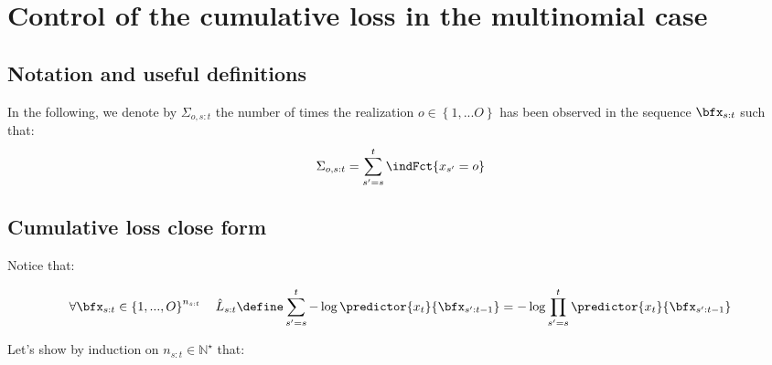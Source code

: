 \documentclass{article} %
\begin{document}
\section{Control of the cumulative loss in the multinomial case}

\subsection{Notation and useful definitions}

	In the following, we denote by $\Sigma_{o,s:t}$ the number of times the realization $o \in \left\lbrace 1,...O \right\rbrace$ has been observed in the sequence $\bfx_{s:t}$ such that:  
	\begin{align*}
	\Sigma_{o,s:t} = \sum_{s'=s}^t \indFct{x_{s'}= o} 
	\end{align*}

\subsection{Cumulative loss close form}

Notice that: 

\begin{align*}
\forall  \bfx_{s:t} \in \left\lbrace 1,..., O \right\rbrace^{n_{s:t}} \quad \hat{L}_{s:t} \define \sum_{s'=s}^t -\log \predictor{x_{t}}{\bfx_{s':t-1}} = -\log \prod_{s'=s}^t \predictor{x_{t}}{\bfx_{s':t-1}}    
\end{align*}

Let's show by induction on $n_{s:t} \in \mathbb{N}^\star$ that: 

\begin{comment}
\begin{align*}
\forall  \bfx_{s:t} \in \left\lbrace 1,..., O \right\rbrace^{n_{s:t}} \quad  \prod_{s'=s}^t  \predictor{x_{t}}{\bfx_{s':t-1}} &=  \frac{\prod\limits_{o=1}^{O}  \Sigma_{o,s:t}! }{\left(n_{s:t}+O-1 \right)!} =  \frac{\prod\limits_{o=1}^{O}  \Sigma_{o,s:t}! }{ \left(\prod\limits_{i=1}^{O-1} \left( n_{s:t}+i \right) \right)  n_{s:t}!} = \red{\frac{ (O-1)! }{ \left(\prod\limits_{i=1}^{O-1} \left( n_{s:t}+i \right) \right)}} \times \frac{\prod\limits_{o=1}^{O}  \Sigma_{o,s:t}! }{   n_{s:t}!} 
\end{align*}
\end{comment}
\end{document}
